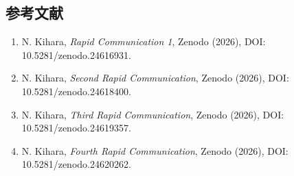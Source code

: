 \documentclass[
  a4paper,
]{ltjsarticle}
\providecommand{\tightlist}{%
  \setlength{\itemsep}{0pt}\setlength{\parskip}{0pt}}
\begin{document}
\subsection{参考文献}\label{ux53c2ux8003ux6587ux732e}

\begin{enumerate}
\def\labelenumi{\arabic{enumi}.}
\tightlist
\item
  N. Kihara, \emph{Rapid Communication 1}, Zenodo (2026), DOI:
  10.5281/zenodo.24616931.
\item
  N. Kihara, \emph{Second Rapid Communication}, Zenodo (2026), DOI:
  10.5281/zenodo.24618400.
\item
  N. Kihara, \emph{Third Rapid Communication}, Zenodo (2026), DOI:
  10.5281/zenodo.24619357.
\item
  N. Kihara, \emph{Fourth Rapid Communication}, Zenodo (2026), DOI:
  10.5281/zenodo.24620262.
\end{enumerate}
\end{document}
